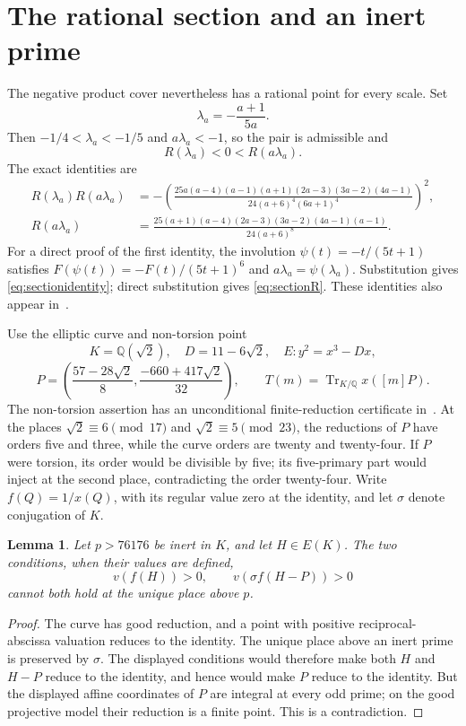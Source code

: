 \documentclass[11pt,a4paper]{article}
\newtheorem{lemma}[theorem]{Lemma}
\newcommand{\Q}{\mathbb Q}\newcommand{\Z}{\mathbb Z}
\DeclareMathOperator{\Tr}{Tr}
\begin{document}
\section{The rational section and an inert prime}

The negative product cover nevertheless has a rational point
for every scale. Set
\begin{equation}\label{eq:section}
                         \lambda_a=-\frac{a+1}{5a}.
\end{equation}
Then $-1/4<\lambda_a<-1/5$ and $a\lambda_a<-1$, so the pair
is admissible and
\begin{equation}\label{eq:signs}
                         R(\lambda_a)<0<R(a\lambda_a).
\end{equation}
The exact identities are
\begin{align}
 R(\lambda_a)R(a\lambda_a)
 &=-\left(\frac{25a(a-4)(a-1)(a+1)(2a-3)(3a-2)(4a-1)}
 {24(a+6)^4(6a+1)^4}\right)^2,\label{eq:sectionidentity}\\
 R(a\lambda_a)
 &=\frac{25(a+1)(a-4)(2a-3)(3a-2)(4a-1)(a-1)}
 {24(a+6)^8}.\label{eq:sectionR}
\end{align}
For a direct proof of the first identity, the involution
$\psi(t)=-t/(5t+1)$ satisfies
$F(\psi(t))=-F(t)/(5t+1)^6$ and
$a\lambda_a=\psi(\lambda_a)$. Substitution gives
\eqref{eq:sectionidentity}; direct substitution gives
\eqref{eq:sectionR}. These identities also appear in~\cite{Product}.

Use the elliptic curve and non-torsion point
\[
 K=\Q(\sqrt2),\quad D=11-6\sqrt2,\quad E:y^2=x^3-Dx,
\]
\[
 P=\left(\frac{57-28\sqrt2}{8},
          \frac{-660+417\sqrt2}{32}\right),\qquad
 T(m)=\Tr_{K/\Q}x([m]P).
\]
The non-torsion assertion has an unconditional finite-reduction
certificate in~\cite{CM}. At the places $\sqrt2\equiv6\pmod{17}$
and $\sqrt2\equiv5\pmod{23}$, the reductions of $P$ have orders
five and three, while the curve orders are twenty and twenty-four.
If $P$ were torsion, its order would be divisible by five; its
five-primary part would inject at the second place, contradicting
the order twenty-four. Write $f(Q)=1/x(Q)$, with its regular
value zero at the identity, and let $\sigma$ denote conjugation of $K$.

\begin{lemma}\label{lem:inert}
Let $p>76176$ be inert in $K$, and let $H\in E(K)$.
The two conditions, when their values are defined,
\[
                  v(f(H))>0,\qquad
                  v(\sigma f(H-P))>0
\]
cannot both hold at the unique place above $p$.
\end{lemma}
\begin{proof}
The curve has good reduction, and a point with positive
reciprocal-abscissa valuation reduces to the identity. The
unique place above an inert prime is preserved by $\sigma$.
The displayed conditions would therefore make both $H$ and
$H-P$ reduce to the identity, and hence would make $P$ reduce
to the identity. But the displayed affine coordinates of $P$
are integral at every odd prime; on the good projective model
their reduction is a finite point. This is a contradiction.
\end{proof}
\end{document}
